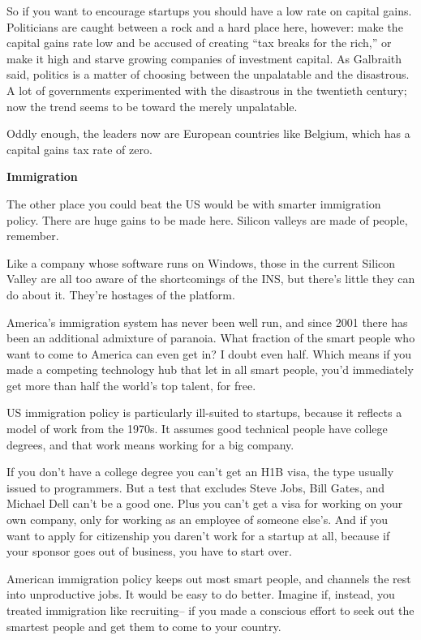 So if you want to encourage startups you should have a low rate on
capital gains. Politicians are caught between a rock and a hard place
here, however: make the capital gains rate low and be accused of
creating ``tax breaks for the rich,'' or make it high and starve growing
companies of investment capital. As Galbraith said, politics is a matter
of choosing between the unpalatable and the disastrous. A lot of
governments experimented with the disastrous in the twentieth century;
now the trend seems to be toward the merely unpalatable.

Oddly enough, the leaders now are European countries like Belgium, which
has a capital gains tax rate of zero.

\textbf{Immigration}

The other place you could beat the US would be with smarter immigration
policy. There are huge gains to be made here. Silicon valleys are made
of people, remember.

Like a company whose software runs on Windows, those in the current
Silicon Valley are all too aware of the shortcomings of the INS, but
there's little they can do about it. They're hostages of the platform.

America's immigration system has never been well run, and since 2001
there has been an additional admixture of paranoia. What fraction of the
smart people who want to come to America can even get in? I doubt even
half. Which means if you made a competing technology hub that let in all
smart people, you'd immediately get more than half the world's top
talent, for free.

US immigration policy is particularly ill-suited to startups, because it
reflects a model of work from the 1970s. It assumes good technical
people have college degrees, and that work means working for a big
company.

If you don't have a college degree you can't get an H1B visa, the type
usually issued to programmers. But a test that excludes Steve Jobs, Bill
Gates, and Michael Dell can't be a good one. Plus you can't get a visa
for working on your own company, only for working as an employee of
someone else's. And if you want to apply for citizenship you daren't
work for a startup at all, because if your sponsor goes out of business,
you have to start over.

American immigration policy keeps out most smart people, and channels
the rest into unproductive jobs. It would be easy to do better. Imagine
if, instead, you treated immigration like recruiting-- if you made a
conscious effort to seek out the smartest people and get them to come to
your country.

